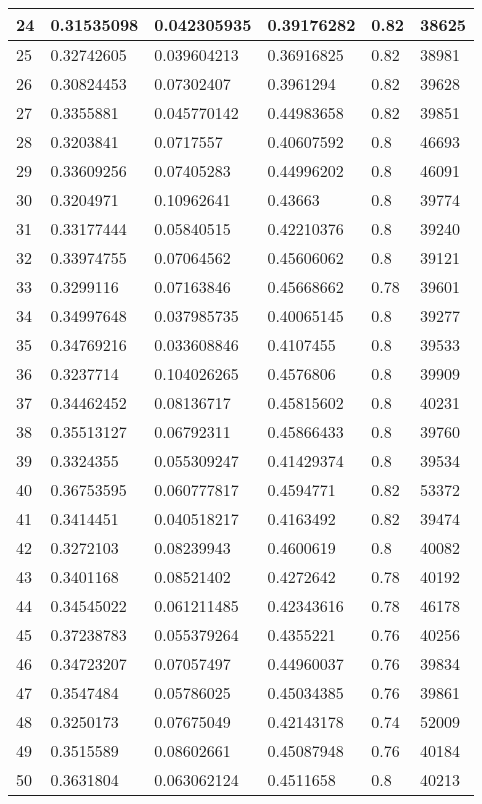\begin{longtable}{|l|l|l|l|l|l|}
24 & 0.31535098 & 0.042305935 & 0.39176282 & 0.82 & 38625 \\ \hline 
25 & 0.32742605 & 0.039604213 & 0.36916825 & 0.82 & 38981 \\ \hline 
26 & 0.30824453 & 0.07302407 & 0.3961294 & 0.82 & 39628 \\ \hline 
27 & 0.3355881 & 0.045770142 & 0.44983658 & 0.82 & 39851 \\ \hline 
28 & 0.3203841 & 0.0717557 & 0.40607592 & 0.8 & 46693 \\ \hline 
29 & 0.33609256 & 0.07405283 & 0.44996202 & 0.8 & 46091 \\ \hline 
30 & 0.3204971 & 0.10962641 & 0.43663 & 0.8 & 39774 \\ \hline 
31 & 0.33177444 & 0.05840515 & 0.42210376 & 0.8 & 39240 \\ \hline 
32 & 0.33974755 & 0.07064562 & 0.45606062 & 0.8 & 39121 \\ \hline 
33 & 0.3299116 & 0.07163846 & 0.45668662 & 0.78 & 39601 \\ \hline 
34 & 0.34997648 & 0.037985735 & 0.40065145 & 0.8 & 39277 \\ \hline 
35 & 0.34769216 & 0.033608846 & 0.4107455 & 0.8 & 39533 \\ \hline 
36 & 0.3237714 & 0.104026265 & 0.4576806 & 0.8 & 39909 \\ \hline 
37 & 0.34462452 & 0.08136717 & 0.45815602 & 0.8 & 40231 \\ \hline 
38 & 0.35513127 & 0.06792311 & 0.45866433 & 0.8 & 39760 \\ \hline 
39 & 0.3324355 & 0.055309247 & 0.41429374 & 0.8 & 39534 \\ \hline 
40 & 0.36753595 & 0.060777817 & 0.4594771 & 0.82 & 53372 \\ \hline 
41 & 0.3414451 & 0.040518217 & 0.4163492 & 0.82 & 39474 \\ \hline 
42 & 0.3272103 & 0.08239943 & 0.4600619 & 0.8 & 40082 \\ \hline 
43 & 0.3401168 & 0.08521402 & 0.4272642 & 0.78 & 40192 \\ \hline 
44 & 0.34545022 & 0.061211485 & 0.42343616 & 0.78 & 46178 \\ \hline 
45 & 0.37238783 & 0.055379264 & 0.4355221 & 0.76 & 40256 \\ \hline 
46 & 0.34723207 & 0.07057497 & 0.44960037 & 0.76 & 39834 \\ \hline 
47 & 0.3547484 & 0.05786025 & 0.45034385 & 0.76 & 39861 \\ \hline 
48 & 0.3250173 & 0.07675049 & 0.42143178 & 0.74 & 52009 \\ \hline 
49 & 0.3515589 & 0.08602661 & 0.45087948 & 0.76 & 40184 \\ \hline 
50 & 0.3631804 & 0.063062124 & 0.4511658 & 0.8 & 40213 \\ \hline 
\end{longtable}